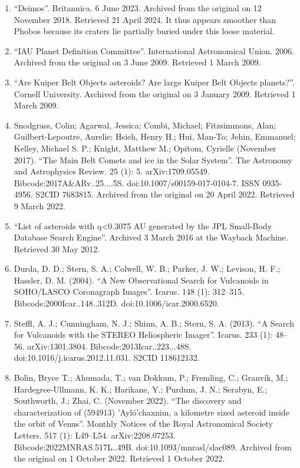 \begin{enumerate}
\item ``Deimos''. Britannica. 6 June 2023. Archived from the original on 12 November 2018. Retrieved 21 April 2024. It thus appears smoother than Phobos because its craters lie partially buried under this loose material.
\item ``IAU Planet Definition Committee''. International Astronomical Union. 2006. Archived from the original on 3 June 2009. Retrieved 1 March 2009.
\item ``Are Kuiper Belt Objects asteroids? Are large Kuiper Belt Objects planets?''. Cornell University. Archived from the original on 3 January 2009. Retrieved 1 March 2009.
\item Snodgrass, Colin; Agarwal, Jessica; Combi, Michael; Fitzsimmons, Alan; Guilbert-Lepoutre, Aurelie; Hsieh, Henry H.; Hui, Man-To; Jehin, Emmanuel; Kelley, Michael S. P.; Knight, Matthew M.; Opitom, Cyrielle (November 2017). ``The Main Belt Comets and ice in the Solar System''. The Astronomy and Astrophysics Review. 25 (1): 5. arXiv:1709.05549. Bibcode:2017A\&ARv..25....5S. doi:10.1007/s00159-017-0104-7. ISSN 0935-4956. S2CID 7683815. Archived from the original on 20 April 2022. Retrieved 9 March 2022.
\item ``List of asteroids with q<0.3075 AU generated by the JPL Small-Body Database Search Engine''. Archived 3 March 2016 at the Wayback Machine. Retrieved 30 May 2012.
\item Durda, D. D.; Stern, S. A.; Colwell, W. B.; Parker, J. W.; Levison, H. F.; Hassler, D. M. (2004). ``A New Observational Search for Vulcanoids in SOHO/LASCO Coronagraph Images''. Icarus. 148 (1): 312–315. Bibcode:2000Icar..148..312D. doi:10.1006/icar.2000.6520.
\item Steffl, A. J.; Cunningham, N. J.; Shinn, A. B.; Stern, S. A. (2013). ``A Search for Vulcanoids with the STEREO Heliospheric Imager''. Icarus. 233 (1): 48–56. arXiv:1301.3804. Bibcode:2013Icar..223...48S. doi:10.1016/j.icarus.2012.11.031. S2CID 118612132.
\item Bolin, Bryce T.; Ahumada, T.; van Dokkum, P.; Fremling, C.; Granvik, M.; Hardegree-Ullmann, K. K.; Harikane, Y.; Purdum, J. N.; Serabyn, E.; Southworth, J.; Zhai, C. (November 2022). ``The discovery and characterization of (594913) 'Ayló'chaxnim, a kilometre sized asteroid inside the orbit of Venus''. Monthly Notices of the Royal Astronomical Society Letters. 517 (1): L49–L54. arXiv:2208.07253. Bibcode:2022MNRAS.517L..49B. doi:10.1093/mnrasl/slac089. Archived from the original on 1 October 2022. Retrieved 1 October 2022.

\end{enumerate}
